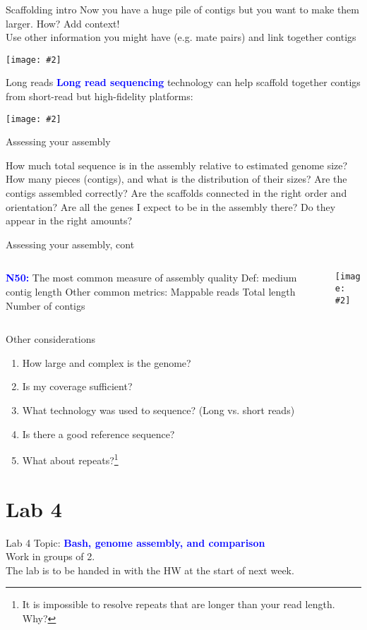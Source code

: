 \documentclass{beamer}
\renewcommand{\c}[1]{\begin{center}#1\end{center}}
\newcommand{\blu}[1]{\textcolor{blue}{\textbf{#1}}}
\newcommand{\gr}[2][.95]{\c{\texttt{[image: \#2]}}}
\begin{document}
\begin{frame}{Scaffolding intro}
Now you have a huge pile of contigs but you want to make them larger. How? Add context!\\
\bigskip Use other information you might have (e.g. mate pairs) and link together contigs
\gr{l4_figs/s24_scaffolding.png}
\end{frame}

\begin{frame}{Long reads}
\blu{Long read sequencing} technology can help scaffold together contigs from short-read but high-fidelity platforms: 
\gr{l4_figs/s25_long_reads.png}
\end{frame}

\begin{frame}{Assessing your assembly}
\begin{outline}
    \1[] How much total sequence is in the assembly relative to estimated genome size?
    \1[] How many pieces (contigs), and what is the distribution of their sizes?
    \1[] Are the contigs assembled correctly?
    \1[] Are the scaffolds connected in the right order and orientation?
    \1[] Are all the genes I expect to be in the assembly there? Do they appear in the right amounts?
\end{outline}
\end{frame}

\begin{frame}{Assessing your assembly, cont}
\begin{columns}
\begin{column}{0.5\textwidth}
 \begin{outline}
     \1[] \blu{N50:} The most common measure of assembly quality
        \2[] Def: medium contig length
    \1[] Other common metrics:
        \2 Mappable reads
        \2 Total length
        \2 Number of contigs
 \end{outline}
\end{column}
\begin{column}{0.5\textwidth}
    \gr{l4_figs/s27_quality.png}
\end{column}
\end{columns}
\end{frame}

\begin{frame}{Other considerations}
\begin{enumerate}
    \item How large and complex is the genome?
    \item Is my coverage sufficient?
    \item What technology was used to sequence? (Long vs. short reads)
    \item Is there a good reference sequence?
    \item What about repeats?\footnote{It is impossible to resolve repeats that are longer than your read length. Why?}
\end{enumerate}
\end{frame}

\section{Lab 4}

\begin{frame}{Lab 4}
Topic: \blu{Bash, genome assembly, and comparison}\\
\bigskip
Work in groups of 2.\\
\bigskip
The lab is to be handed in with the HW at the start of next week.
\end{frame}
\end{document}
